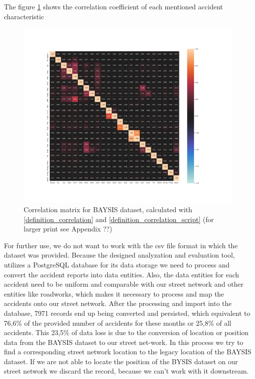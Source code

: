 \documentclass[a4paper,12pt]{report}
\begin{document}
The figure \ref{img:correlation_matrix_dataset} shows the correlation coefficient of each mentioned accident characteristic 

\begin{figure}[h]
	\centering
	\includegraphics[scale=0.2]{../CorrAnalysis/data/BAYSIS/dataset/plots/baysis_dataset_corr_theils}
	\caption{Correlation matrix for BAYSIS dataset, calculated with \ref{definition_correlation} and \ref{definition_correlation_script} (for larger print see Appendix ??)}
	\label{img:correlation_matrix_dataset}
\end{figure}

For further use, we do not want to work with the \acrshort{csv} file format in which the dataset was provided. Because the designed analyzation and evaluation tool, utilizes a PostgreSQL database for its data storage we need to process and convert the accident reports into data entities. Also, the data entities for each accident need to be uniform and comparable with our street network and other entities like roadworks, which makes it necessary to process and map the accidents onto our street network. After the processing and import into the database, 7971 records end up being converted and persisted, which equivalent to 76,6\% of the provided number of accidents for these months or 25,8\% of all accidents. This 23,5\% of data loss is due to the conversion of location or position data from the BAYSIS dataset to our street net-work. In this process we try to find a corresponding street network location to the legacy location of the BAYSIS dataset. If we are not able to locate the position of the BYSIS dataset on our street network we discard the record, because we can’t work with it downstream. 
\end{document}
